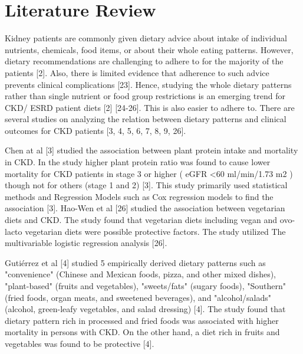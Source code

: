 \section{Literature Review}

\medskip
Kidney patients are commonly given dietary advice about intake of individual nutrients, chemicals, food items, or about their whole eating patterns. However, dietary recommendations are challenging to adhere to for the majority of the patients [2]. Also, there is limited evidence that adherence to such advice prevents clinical complications [23]. Hence, studying the whole dietary patterns rather than single nutrient or food group restrictions is an emerging trend for CKD/ ESRD patient diets [2] [24-26]. This is also easier to adhere to. There are several studies on analyzing the relation between dietary patterns and clinical outcomes for CKD patients [3, 4, 5, 6, 7, 8, 9, 26].

\medskip
\noindent Chen at al [3] studied the association between plant protein intake and mortality in CKD. In the study higher plant protein ratio was found to cause lower mortality for CKD patients in stage 3 or higher ( eGFR  \textless 60 ml/min/1.73 m2 ) though not for others (stage 1 and 2) [3]. This study primarily used statistical methods and Regression Models such as Cox regression models to find the association [3]. Hao-Wen et al [26] studied the association between vegetarian diets and CKD. The study found that vegetarian diets including vegan and ovo-lacto vegetarian diets were possible protective factors. The study utilized The multivariable logistic regression analysis [26].

\medskip
\noindent Gutiérrez et al [4] studied 5 empirically derived dietary patterns such as "convenience" (Chinese and Mexican foods, pizza, and other mixed dishes), "plant-based" (fruits and vegetables), "sweets/fats" (sugary foods), "Southern" (fried foods, organ meats, and sweetened beverages), and "alcohol/salads" (alcohol, green-leafy vegetables, and salad dressing) [4]. The study found that dietary pattern rich in processed and fried foods was associated with higher mortality in persons with CKD. On the other hand, a diet rich in fruits and vegetables was found to be protective [4].

